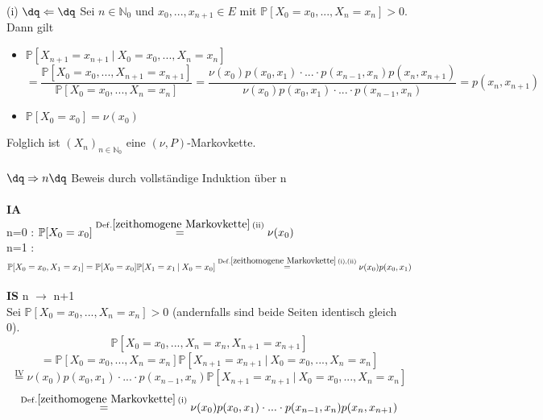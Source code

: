 (i) $\dq \Leftarrow \dq$ Sei $n \in \mathbb{N}_{0}$ und $x_{0},...,x_{n+1} \in E$ mit $\mathbb{P}[X_{0} = x_{0},...,X_{n} = x_{n}]>0$. Dann gilt
\begin{itemize}
\item $\mathbb{P}[X_{n+1} = x_{n+1} \: | \: X_{0} = x_{0},...,X_{n} = x_{n}]$
\begin{equation*}
=\dfrac{\mathbb{P}[X_{0} = x_{0},...,X_{n+1} = x_{n+1}]}{\mathbb{P}[X_{0} = x_{0},...,X_{n} = x_{n}]} = \dfrac{\nu(x_{0}) p(x_{0},x_{1}) \cdot ...\cdot p(x_{n-1},x_{n})p(x_{n},x_{n+1})}{\nu(x_{0}) p(x_{0},x_{1}) \cdot ...\cdot p(x_{n-1},x_{n})} = p(x_{n},x_{n+1})
\end{equation*}
\item $\mathbb{P}[X_{0} = x_{0}] = \nu(x_{0})$
\end{itemize}
Folglich ist ${(X_{n})}_{n \in \mathbb{N}_{0}}$ eine $(\nu,P)$-Markovkette.
\\
\\
$\dq \Rightarrow n\dq$ Beweis durch vollständige Induktion über  n
\\
\\
\textbf{IA}
\\
n=0 : $\mathbb{P}[X_{0} = x_{0}] \stackrel{\mathrm{Def.} \ref{zeithomogene Markovkette} \:        \mathrm{(ii)}}{=} \nu(x_{0})$
\\
n=1 : $\mathbb{P}[X_{0} = x_{0},X_{1} = x_{1}] = \mathbb{P}[X_{0} = x_{0}]\mathbb{P}[X_{1} = x_{1} \: | \: X_{0} = x_{0}]  \stackrel{\mathrm{Def.} \ref{zeithomogene Markovkette} \: \mathrm{(i),(ii)}}{=} \nu(x_{0})p(x_{0},x_{1})$
\\
\\
\textbf{IS} n $\to$ n+1
\\
Sei $\mathbb{P}[X_{0} = x_{0},...,X_{n} = x_{n}]>0$ (andernfalls sind beide Seiten identisch gleich 0).
\begin{equation*}
\mathbb{P}[X_{0} = x_{0},...,X_{n} = x_{n}, X_{n+1} = x_{n+1}]
\end{equation*}
\begin{equation*}
= \mathbb{P}[X_{0} = x_{0},...,X_{n} = x_{n}]\mathbb{P}[X_{n+1} = x_{n+1          }\: | \: X_{0} = x_{0},...,X_{n} = x_{n}]
\end{equation*}
\begin{equation*}
\stackrel{\mathrm{IV}}{=} \nu(x_{0}) p(x_{0},x_{1}) \cdot ...\cdot p(x_{n-1},x_{n})\mathbb{P}[X_{n+1} = x_{n+1}\: | \: X_{0} = x_{0},...,X_{n} = x_{n}]
\end{equation*}
\begin{equation*}
\stackrel{\mathrm{Def.}\ref{zeithomogene Markovkette} \: \mathrm{(i)}}{=} \nu(x_{0}) p(x_{0},x_{1}) \cdot ...\cdot p(x_{n-1},x_{n})p(x_{n},x_{n+1})
\end{equation*}
